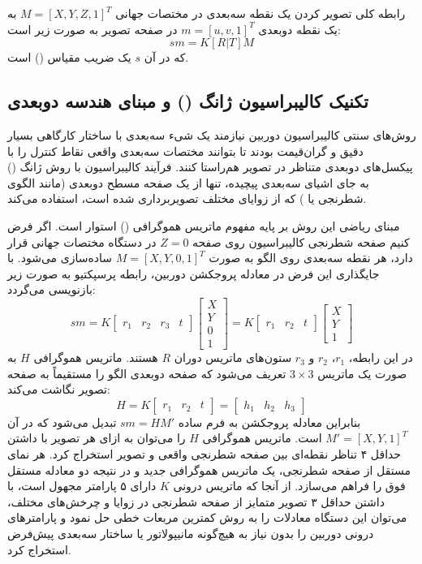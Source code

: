 \documentclass[12pt,a4paper]{article}
\begin{document}
رابطه کلی تصویر کردن یک نقطه سه‌بعدی در مختصات جهانی $M=[X, Y, Z, 1]^T$ به یک نقطه دوبعدی $m=[u, v, 1]^T$ در صفحه تصویر به صورت زیر است:
\begin{equation}
s m = K [R | T] M
\end{equation}
که در آن $s$ یک ضریب مقیاس () است.

\subsection{تکنیک کالیبراسیون ژانگ () و مبنای هندسه دوبعدی}
روش‌های سنتی کالیبراسیون دوربین نیازمند یک شیء سه‌بعدی با ساختار کارگاهی بسیار دقیق و گران‌قیمت بودند تا بتوانند مختصات سه‌بعدی واقعی نقاط کنترل را با پیکسل‌های دوبعدی متناظر در تصویر هم‌راستا کنند. فرآیند کالیبراسیون با روش ژانگ () به جای اشیای سه‌بعدی پیچیده، تنها از یک صفحه مسطح دوبعدی (مانند الگوی شطرنجی یا ) که از زوایای مختلف تصویربرداری شده است، استفاده می‌کند.

مبنای ریاضی این روش بر پایه مفهوم ماتریس هموگرافی () استوار است. اگر فرض کنیم صفحه شطرنجی کالیبراسیون روی صفحه $Z=0$ در دستگاه مختصات جهانی قرار دارد، هر نقطه سه‌بعدی روی الگو به صورت $M=[X,Y,0,1]^T$ ساده‌سازی می‌شود. با جایگذاری این فرض در معادله پروجکشن دوربین، رابطه پرسپکتیو به صورت زیر بازنویسی می‌گردد:
\begin{equation}
	sm = K\begin{bmatrix}r_1 & r_2 & r_3 & t\end{bmatrix}\begin{bmatrix}X \\ Y \\ 0 \\ 1\end{bmatrix} = K\begin{bmatrix}r_1 & r_2 & t\end{bmatrix}\begin{bmatrix}X \\ Y \\ 1\end{bmatrix}
\end{equation}
در این رابطه، $r_1$، $r_2$ و $r_3$ ستون‌های ماتریس دوران $R$ هستند. ماتریس هموگرافی $H$ به صورت یک ماتریس $3\times3$ تعریف می‌شود که صفحه دوبعدی الگو را مستقیماً به صفحه تصویر نگاشت می‌کند:
\begin{equation}
	H = K\begin{bmatrix}r_1 & r_2 & t\end{bmatrix} = \begin{bmatrix}h_1 & h_2 & h_3\end{bmatrix}
\end{equation}
بنابراین معادله پروجکشن به فرم ساده $sm = HM'$ تبدیل می‌شود که در آن $M'=[X,Y,1]^T$ است. ماتریس هموگرافی $H$ را می‌توان به ازای هر تصویر با داشتن حداقل ۴ تناظر نقطه‌ای بین صفحه شطرنجی واقعی و تصویر استخراج کرد.
هر نمای مستقل از صفحه شطرنجی، یک ماتریس هموگرافی جدید و در نتیجه دو معادله مستقل فوق را فراهم می‌سازد. از آنجا که ماتریس درونی $K$ دارای ۵ پارامتر مجهول است، با داشتن حداقل ۳ تصویر متمایز از صفحه شطرنجی در زوایا و چرخش‌های مختلف، می‌توان این دستگاه معادلات را به روش کمترین مربعات خطی حل نمود و پارامترهای درونی دوربین را بدون نیاز به هیچ‌گونه مانیپولاتور یا ساختار سه‌بعدی پیش‌فرض استخراج کرد.
\end{document}
